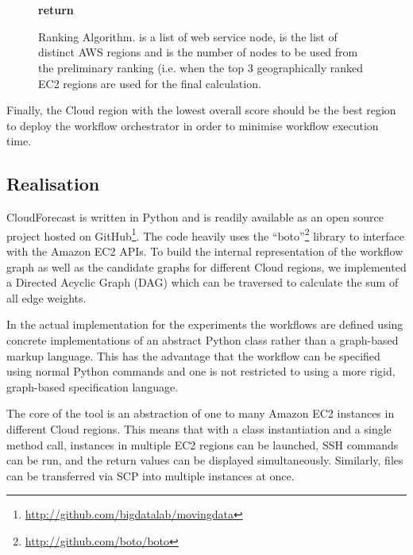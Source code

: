 \documentclass[10pt, conference, compsocconf]{IEEEtran}
\newcommand{\sysname}{CloudForecast\xspace}
\begin{document}
\begin{figure}
  \begin{algorithmic}
      \State 
      \State 
      \State 
      \State \\

      \State 
      \For{}
        \State 
      \EndFor
      \\
      \State \textbf{return} 
    \EndProcedure
  \end{algorithmic}
\caption{Ranking Algorithm.  is a list of web service node,  is the list of distinct AWS regions and  is the number of nodes to be used from the preliminary ranking (i.e. when  the top 3 geographically ranked EC2 regions are used for the final calculation.}\label{eq:score}
\end{figure}


Finally, the Cloud region with the lowest overall score should be the best region to deploy the workflow orchestrator in order to minimise workflow execution time.


\subsection{Realisation}






\sysname is written in Python and is readily available as an open source project hosted on GitHub\footnote{\url{http://github.com/bigdatalab/movingdata}}. The code heavily uses the ``boto''\footnote{\url{http://github.com/boto/boto}} library to interface with the Amazon EC2 APIs. To build the internal representation of the workflow graph as well as the candidate graphs for different Cloud regions, we implemented a Directed Acyclic Graph (DAG) which can be traversed to calculate the sum of all edge weights.

In the actual implementation for the experiments the workflows are defined using concrete implementations of an abstract Python class rather than a graph-based markup language. This has the advantage that the workflow can be specified using normal Python commands and one is not restricted to using a more rigid, graph-based specification language.


The core of the tool is an abstraction of one to many Amazon EC2 instances in different Cloud regions. This means that with a class instantiation and a single method call, instances in multiple EC2 regions can be launched, SSH commands can be run, and the return values can be displayed simultaneously. Similarly, files can be transferred via SCP into multiple instances at once.
\end{document}
